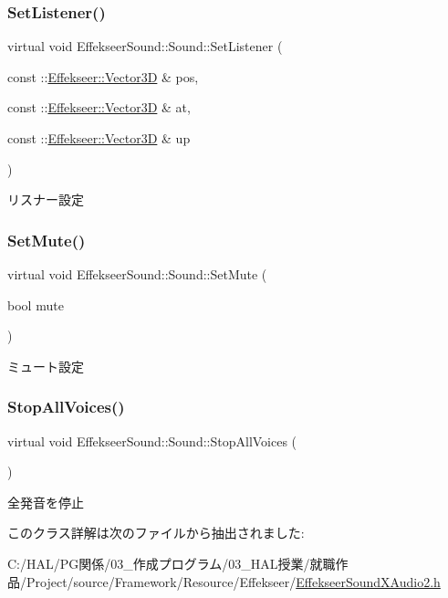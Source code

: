 \subsubsection{\texorpdfstring{Set\+Listener()}{SetListener()}}
{\footnotesize\ttfamily virtual void Effekseer\+Sound\+::\+Sound\+::\+Set\+Listener (\begin{DoxyParamCaption}\item[{const \+::\mbox{\hyperlink{struct_effekseer_1_1_vector3_d}{Effekseer\+::\+Vector3D}} \&}]{pos,  }\item[{const \+::\mbox{\hyperlink{struct_effekseer_1_1_vector3_d}{Effekseer\+::\+Vector3D}} \&}]{at,  }\item[{const \+::\mbox{\hyperlink{struct_effekseer_1_1_vector3_d}{Effekseer\+::\+Vector3D}} \&}]{up }\end{DoxyParamCaption})\hspace{0.3cm}{\ttfamily [pure virtual]}}



リスナー設定 

\mbox{\label{class_effekseer_sound_1_1_sound_a60df80be173cb76ef495bde597a7c407}} 
\subsubsection{\texorpdfstring{Set\+Mute()}{SetMute()}}
{\footnotesize\ttfamily virtual void Effekseer\+Sound\+::\+Sound\+::\+Set\+Mute (\begin{DoxyParamCaption}\item[{bool}]{mute }\end{DoxyParamCaption})\hspace{0.3cm}{\ttfamily [pure virtual]}}



ミュート設定 

\mbox{\label{class_effekseer_sound_1_1_sound_ace2026566bc2bdaf49962293c5b06aa2}} 
\subsubsection{\texorpdfstring{Stop\+All\+Voices()}{StopAllVoices()}}
{\footnotesize\ttfamily virtual void Effekseer\+Sound\+::\+Sound\+::\+Stop\+All\+Voices (\begin{DoxyParamCaption}{ }\end{DoxyParamCaption})\hspace{0.3cm}{\ttfamily [pure virtual]}}



全発音を停止 



このクラス詳解は次のファイルから抽出されました\+:\begin{DoxyCompactItemize}
\item 
C\+:/\+H\+A\+L/\+P\+G関係/03\+\_\+作成プログラム/03\+\_\+\+H\+A\+L授業/就職作品/\+Project/source/\+Framework/\+Resource/\+Effekseer/\mbox{\hyperlink{_effekseer_sound_x_audio2_8h}{Effekseer\+Sound\+X\+Audio2.\+h}}\end{DoxyCompactItemize}
